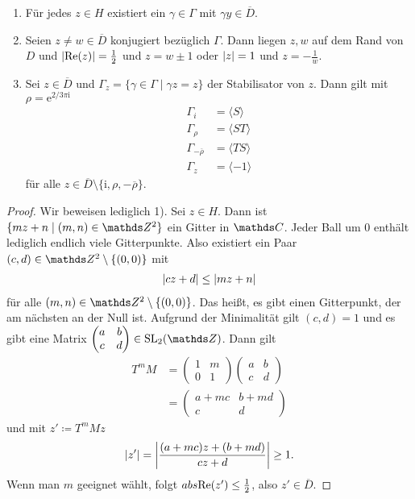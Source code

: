\begin{thm}
\begin{enumerate}[label=(\arabic*)]
\item Für jedes $z\in H$ existiert ein $\gamma \in \Gamma$ mit $\gamma y\in \overline{D}$.
\item Seien $z \not =w\in \overline{D}$ konjugiert bezüglich $\Gamma$. Dann liegen $z,w$ auf dem Rand von $D$ und $\left\vert\operatorname{Re}(z)\right\vert=\frac{1}{2}$ und $z=w \pm 1$ oder $\left\vert z\right\vert=1$ und $z=-\frac{1}{w}$.
\item Sei $z\in \overline{D}$ und $\Gamma_z=\{\gamma \in \Gamma \mid \gamma z=z\}$ der Stabilisator von $z$.
Dann gilt mit $\rho=\mathrm{e}^{2/3\pi \mathrm{i}}$
\begin{align*}
\Gamma_i&=\langle S \rangle\\
\Gamma_\rho&=\langle ST \rangle\\
\Gamma_{-\overline{\rho}}&=\langle TS \rangle\\
\Gamma_z&=\langle -1 \rangle
\end{align*}
für alle $z\in \overline{D} \setminus  \{\mathrm{i},\rho,-\overline{\rho}\}$.
\end{enumerate}
\end{thm}

\begin{proof}
Wir beweisen lediglich 1).
Sei $z\in H$. Dann ist $\{mz+n \mid (m,n)\in \Z^2\}$ ein Gitter in $\C$.
Jeder Ball um $0$ enthält lediglich endlich viele Gitterpunkte.
Also existiert ein Paar $(c,d)\in \Z^2\setminus \{(0,0)\}$ mit 
\begin{align*}
\left\vert cz+d\right\vert\leq \left\vert mz+n\right\vert
\end{align*}
für alle $(m,n)\in \Z^2\setminus \{(0,0)\}$.
Das heißt, es gibt einen Gitterpunkt, der am nächsten an der Null ist.
Aufgrund der Minimalität gilt $(c,d)=1$ und es gibt eine Matrix
$\begin{pmatrix}
a&b\\
c&d
\end{pmatrix} \in \SL_2(\Z)$.
Dann gilt
\begin{align*}
T^m M &= \begin{pmatrix}
1&m\\
0&1
\end{pmatrix}\begin{pmatrix}
a&b\\
c&d
\end{pmatrix}\\
&=\begin{pmatrix}
a+mc&b+md\\
c&d
\end{pmatrix}
\end{align*}
und mit $z'\coloneq T^m Mz$
\begin{align*}
\left\vert z'\right\vert=\left\vert\frac{(a+mc)z+(b+md)}{cz+d}\right\vert \geq 1.
\end{align*}
Wenn man $m$ geeignet wählt, folgt $abs{\operatorname{Re}(z')}\leq \frac{1}{2}$, also $z'\in \overline{D}$.
\end{proof}

